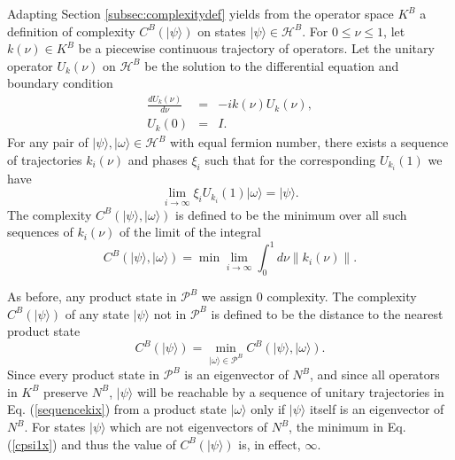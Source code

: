 \documentclass[12pt,amsmath,amssymb,onecolumn]{revtex4-2}
\begin{document}
Adapting Section \ref{subsec:complexitydef} yields from
the operator space $K^B$ a definition of complexity $C^B( |\psi \rangle )$ on states $|\psi \rangle  \in \mathcal{H}^B$.
For $0 \leq \nu \leq 1$, let $k( \nu) \in K^B$ be a piecewise continuous trajectory of operators.
Let the unitary operator $U_k(\nu)$ on $\mathcal{H}^B$ be the solution to the differential
equation and boundary condition
\begin{subequations}
\begin{eqnarray}
\label{udotx}
\frac{dU_k(\nu)}{d \nu} & = &-i k( \nu) U_k( \nu), \\
\label{uboundary0x}
U_k( 0) & = & I.
\end{eqnarray}
\end{subequations}
For any pair of $|\psi \rangle , |\omega \rangle  \in \mathcal{H}^B$ with equal
fermion number, there 
exists a sequence of trajectories $k_i(\nu)$ and phases $\xi_i$ such that for the corresponding
$U_{k_i}(1)$ we have
\begin{equation}
\label{sequencekix}
\lim_{i \rightarrow \infty} \xi_i U_{k_i}(1) |\omega \rangle  = |\psi \rangle .
\end{equation}
The complexity $C^B(|\psi \rangle , |\omega \rangle )$ is defined to be the minimum 
over all such sequences of $k_i(\nu)$ of the
limit of the integral
\begin{equation}
\label{complexityx}
C^B(| \psi \rangle , |\omega \rangle ) = \min \lim_{i \rightarrow \infty} \int_0^1 d \nu \parallel k_i( \nu) \parallel. 
\end{equation}

As before, any product state in $\mathcal{P}^B$ we assign 0 complexity. 
The complexity $C^B( |\psi \rangle )$ of any state $|\psi \rangle $ not in $\mathcal{P}^B$
is defined to be the distance to the nearest product state
\begin{equation}
\label{cpsi1x}
C^B( |\psi \rangle ) = \min_{|\omega \rangle  \in \mathcal{P}^B} C^B(| \psi \rangle , |\omega \rangle ).
\end{equation}
Since every product state in $\mathcal{P}^B$ is an eigenvector of $N^B$,
and since all operators in $K^B$ preserve $N^B$,  $|\psi \rangle $ will be reachable by
a sequence of unitary trajectories in Eq. (\ref{sequencekix}) from a product
state $|\omega \rangle $ only if $|\psi \rangle $ itself is an eigenvector of $N^B$.
For states $|\psi \rangle $ which are not eigenvectors of $N^B$, the minimum
in Eq. (\ref{cpsi1x}) and thus the value of $C^B(|\psi \rangle )$ is, in effect, $\infty$.
\end{document}
